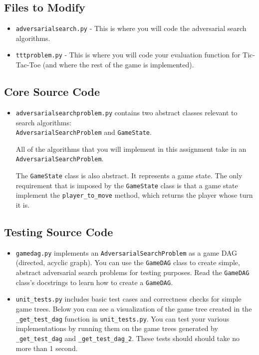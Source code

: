 \documentclass{article}
\begin{document}
\subsection{Files to Modify}
\begin{itemize}
  \item \verb|adversarialsearch.py| - This is where you will code the adversarial search algorithms.

  \item \verb|tttproblem.py| - This is where you will code your evaluation function for Tic-Tac-Toe (and where the rest of the game is implemented).
\end{itemize}


\subsection{Core Source Code}
\begin{itemize}
  \item \verb|adversarialsearchproblem.py| contains two abstract classes relevant to search algorithms: \\
    \verb|AdversarialSearchProblem| and \verb|GameState|.

    All of the algorithms that you will implement in this assignment take in an \verb|AdversarialSearchProblem|.

    The \verb|GameState| class is also abstract.
    It represents a game state.
    The only requirement that is imposed by the \verb|GameState| class is that a game state implement the \verb|player_to_move| method, which returns the player whose turn it is.
\end{itemize}


\subsection{Testing Source Code}
\begin{itemize}
  \item \verb|gamedag.py| implements an \verb|AdversarialSearchProblem| as a game DAG (directed, acyclic graph).
    You can use the \verb|GameDAG| class to create simple, abstract adversarial search problems for testing purposes.
    Read the \verb|GameDAG| class's docstrings to learn how to create a \verb|GameDAG|.

  \item \verb|unit_tests.py| includes basic test cases and correctness checks for simple game trees.
    Below you can see a visualization of the game tree created in the \verb|_get_test_dag| function in \verb|unit_tests.py|.
    You can test your various implementations by running them on the game trees generated by
    \verb|_get_test_dag| and \verb|_get_test_dag_2|.
    These tests should should take no more than 1 second.
\end{itemize}
\end{document}
